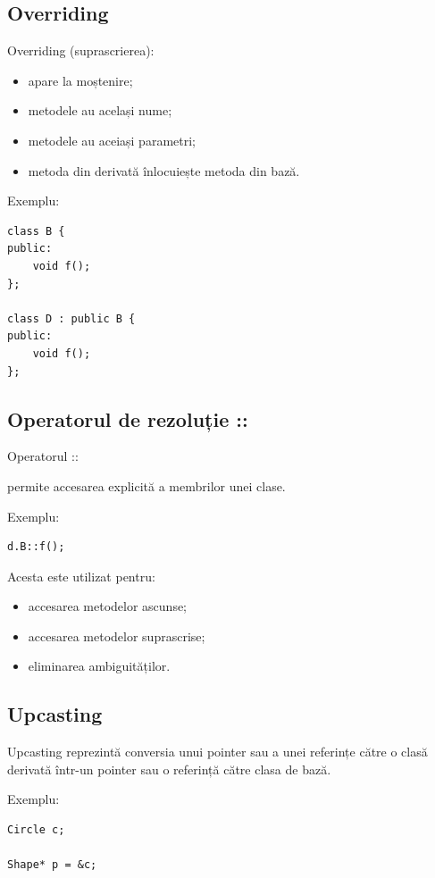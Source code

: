 \documentclass[12pt,a4paper]{article}
\begin{document}
\subsection{Overriding}

Overriding (suprascrierea):

\begin{itemize}
\item apare la moștenire;
\item metodele au același nume;
\item metodele au aceiași parametri;
\item metoda din derivată înlocuiește metoda din bază.
\end{itemize}

Exemplu:

\begin{verbatim}
class B {
public:
    void f();
};

class D : public B {
public:
    void f();
};
\end{verbatim}

\subsection{Operatorul de rezoluție ::}

Operatorul ::

permite accesarea explicită a membrilor unei clase.

Exemplu:

\begin{verbatim}
d.B::f();
\end{verbatim}

Acesta este utilizat pentru:

\begin{itemize}
\item accesarea metodelor ascunse;
\item accesarea metodelor suprascrise;
\item eliminarea ambiguităților.
\end{itemize}

\subsection{Upcasting}

Upcasting reprezintă conversia unui pointer sau a unei referințe către o clasă derivată într-un pointer sau o referință către clasa de bază.

Exemplu:

\begin{verbatim}
Circle c;

Shape* p = &c;
\end{verbatim}
\end{document}
